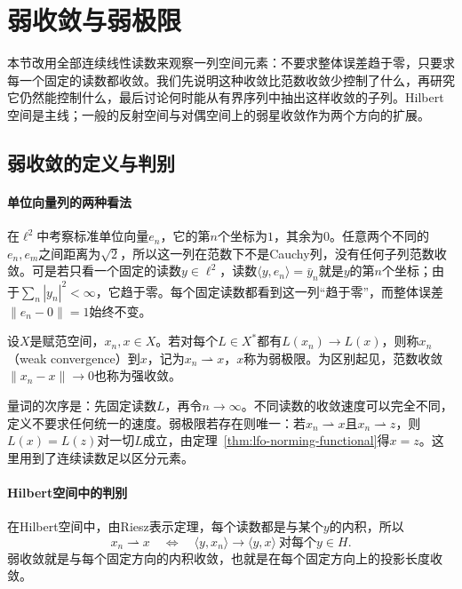 
\section{弱收敛与弱极限}
\label{sec:lfo-weak}

本节改用全部连续线性读数来观察一列空间元素：不要求整体误差趋于零，只要求每一个固定的读数都收敛。我们先说明这种收敛比范数收敛少控制了什么，再研究它仍然能控制什么，最后讨论何时能从有界序列中抽出这样收敛的子列。Hilbert空间是主线；一般的反射空间与对偶空间上的弱星收敛作为两个方向的扩展。

\subsection{弱收敛的定义与判别}
\label{sec:lfo-weak-convergence}

\paragraph{单位向量列的两种看法}
在$\ell^2$中考察标准单位向量$e_n$，它的第$n$个坐标为$1$，其余为$0$。任意两个不同的$e_n,e_m$之间距离为$\sqrt2$，所以这一列在范数下不是Cauchy列，没有任何子列范数收敛。可是若只看一个固定的读数$y\in\ell^2$，读数$\langle y,e_n\rangle=\bar y_n$就是$y$的第$n$个坐标；由于$\sum_n|y_n|^2<\infty$，它趋于零。每个固定读数都看到这一列“趋于零”，而整体误差$\|e_n-0\|=1$始终不变。

\begin{definition}[弱收敛]
\label{def:lfo-weak-convergence}
设$X$是赋范空间，$x_n,x\in X$。若对每个$L\in X^*$都有$L(x_n)\to L(x)$，则称$x_n$（weak convergence）到$x$，记为$x_n\rightharpoonup x$，$x$称为弱极限。为区别起见，范数收敛$\|x_n-x\|\to0$也称为强收敛。
\end{definition}

量词的次序是：先固定读数$L$，再令$n\to\infty$。不同读数的收敛速度可以完全不同，定义不要求任何统一的速度。弱极限若存在则唯一：若$x_n\rightharpoonup x$且$x_n\rightharpoonup z$，则$L(x)=L(z)$对一切$L$成立，由定理~\ref{thm:lfo-norming-functional}得$x=z$。这里用到了连续读数足以区分元素。

\paragraph{Hilbert空间中的判别}
在Hilbert空间中，由Riesz表示定理，每个读数都是与某个$y$的内积，所以
\[
 x_n\rightharpoonup x\quad\Longleftrightarrow\quad\langle y,x_n\rangle\to\langle y,x\rangle\ \text{对每个}y\in H .
\]
弱收敛就是与每个固定方向的内积收敛，也就是在每个固定方向上的投影长度收敛。

